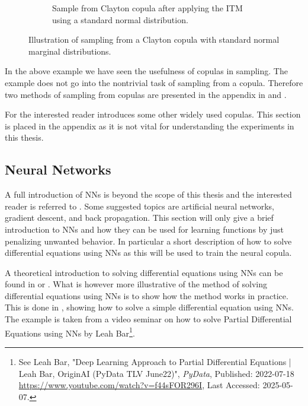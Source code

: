 \begin{figure}[h]
\begin{subfigure}[t]{0.45\linewidth}
        \caption{Sample from Clayton copula after applying the \gls{ITM} using a standard normal distribution.}
        \label{fig:ReturnSpaceDataClayton}
    \end{subfigure}
    \caption{Illustration of sampling from a Clayton copula with standard normal marginal distributions.}
    \label{fig:CopulaSampling}
\end{figure}

In the above example we have seen the usefulness of copulas in sampling. The example does not go into the nontrivial task of sampling from a copula. Therefore two methods of sampling from copulas are presented in the appendix in  and .

For the interested reader  introduces some other widely used copulas. This section is placed in the appendix as it is not vital for understanding the experiments in this thesis. 

\subsection{Neural Networks}\label{sec:NeuralNetworks}
A full introduction of \gls{NN}s is beyond the scope of this thesis and the interested reader is referred to . Some suggested topics are artificial neural networks, gradient descent, and back propagation. This section will only give a brief introduction to \gls{NN}s and how they can be used for learning functions by just penalizing unwanted behavior. In particular a short description of how to solve differential equations using \gls{NN}s as this will be used to train the neural copula.

A theoretical introduction to solving differential equations using \gls{NN}s can be found in  or . What is however more illustrative of the method of solving differential equations using \gls{NN}s is to show how the method works in practice. This is done in , showing how to solve a simple differential equation using \gls{NN}s. The example is taken from a video seminar on how to solve Partial Differential Equations using \gls{NN}s by Leah Bar\footnote{See Leah Bar, "Deep Learning Approach to Partial Differential Equations | Leah Bar, OriginAI (PyData TLV June22)", \textit{PyData}, Published: 2022-07-18 \url{https://www.youtube.com/watch?v=f44sFOR296I}, Last Accessed: 2025-05-07.}. 


